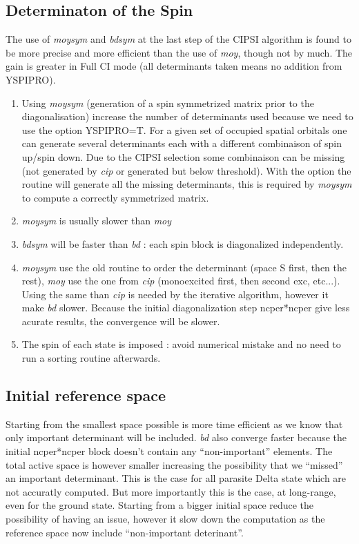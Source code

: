 \documentclass[a4paper,10pt]{article}
\begin{document}
\subsection{Determinaton of the Spin }

The use of \textit{moysym} and \textit{bdsym} at the last step of the CIPSI algorithm is found to be more precise and more efficient than the use of \textit{moy}, though not by much. The gain is greater in Full CI mode (all determinants taken means no addition from YSPIPRO).

\begin{enumerate}
 
\item Using \textit{moysym} (generation of a spin symmetrized matrix prior to the diagonalisation) increase the number of determinants used because we need to use the option YSPIPRO=T. For a given set of occupied spatial orbitals one can generate several determinants each with a different combinaison of spin up/spin down. Due to the CIPSI selection some combinaison can be missing (not generated by \textit{cip} or generated but below threshold). With the option the routine will generate all the missing determinants, this is required by \textit{moysym} to compute a correctly symmetrized matrix. 
\item \textit{moysym} is usually slower than \textit{moy} 
\item \textit{bdsym} will be faster than \textit{bd} : each spin block is diagonalized independently.
\item \textit{moysym} use the old routine to order the determinant (space S first, then the rest), \textit{moy} use the one from \textit{cip} (monoexcited first, then second exc, etc...). Using the same than \textit{cip} is needed by the iterative algorithm, however it make \textit{bd} slower. Because the initial diagonalization step ncper*ncper give less acurate results, the convergence will be slower.
\item The spin of each state is imposed : avoid numerical mistake and no need to run a sorting routine afterwards.

\end{enumerate}

\subsection{Initial reference space}

Starting from the smallest space possible is more time efficient as we know that only important determinant will be included. \textit{bd} also converge faster because the initial ncper*ncper block doesn't contain any ``non-important'' elements. The total active space is however smaller increasing the possibility that we ``missed'' an important determinant. This is the case for all parasite Delta state which are not accuratly computed. But more importantly this is the case, at long-range, even for the ground state.
Starting from a bigger initial space reduce the possibility of having an issue, however it slow down the computation as the reference space now include ``non-important deterinant''.
\end{document}
